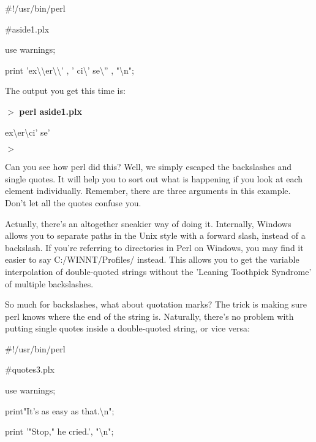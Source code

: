 \documentclass[a4paper,11pt]{book}
\begin{document}
\noindent 

\noindent \#!/usr/bin/perl

\noindent \#aside1.plx

\noindent use warnings;

\noindent print 'ex\textbackslash \textbackslash  er\textbackslash \textbackslash ' , ' ci\textbackslash ' se\textbackslash '' , "\textbackslash n";

\noindent 

\noindent 

\noindent The output you get this time is:

\noindent 

\noindent $>$ \textbf{perl aside1.plx}

\noindent ex\textbackslash  er\textbackslash  ci' se'

\noindent $>$

\noindent 

\noindent Can you see how perl did this? Well, we simply escaped the backslashes and single quotes. It will help you to sort out what is happening if you look at each element individually. Remember, there are three arguments in this example. Don't let all the quotes confuse you.

\noindent 

\noindent Actually, there's an altogether sneakier way of doing it. Internally, Windows allows you to separate paths in the Unix style with a forward slash, instead of a backslash. If you're referring to directories in Perl on Windows, you may find it easier to say C:/WINNT/Profiles/ instead. This allows you to get the variable interpolation of double-quoted strings without the 'Leaning Toothpick Syndrome' of multiple backslashes.

\noindent 

\noindent So much for backslashes, what about quotation marks? The trick is making sure perl knows where the end of the string is. Naturally, there's no problem with putting single quotes inside a double-quoted string, or vice versa:

\noindent 

\noindent 

\noindent \#!/usr/bin/perl

\noindent \#quotes3.plx

\noindent use warnings;

\noindent print"It's as easy as that.\textbackslash n";

\noindent print '"Stop," he cried.', "\textbackslash n";
\end{document}
